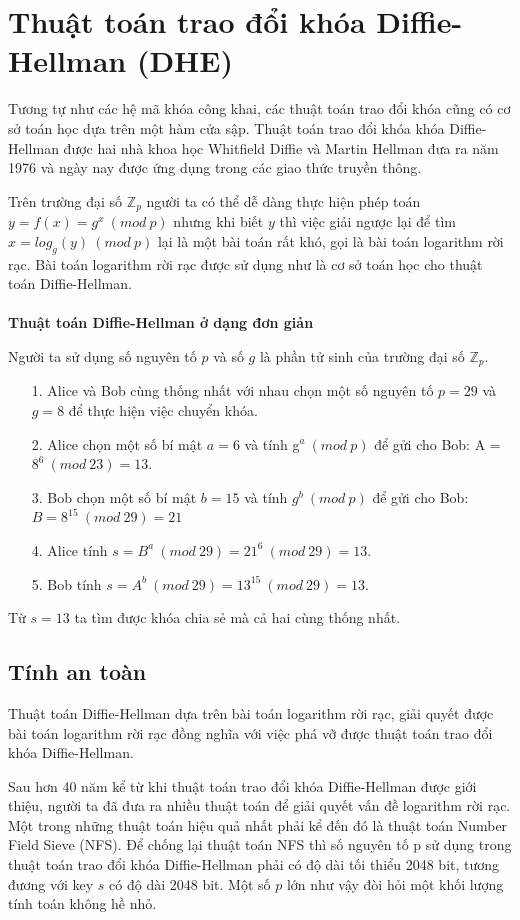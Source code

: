 \documentclass[a4paper,12pt]{report}
\begin{document}
\section{Thuật toán trao đổi khóa Diffie-Hellman (DHE)}
Tương tự như các hệ mã khóa công khai, các thuật toán trao đổi khóa cũng có cơ sở toán học dựa trên một hàm cửa sập. Thuật toán trao đổi khóa khóa Diffie-Hellman   được hai nhà khoa học Whitfield Diffie và Martin Hellman đưa ra năm 1976 và ngày nay được ứng dụng trong các giao thức truyền thông.

Trên trường đại số  $\mathbb{Z}_p$ người ta có thể dễ dàng thực hiện phép toán $y = f(x) = g^x \ (mod \ p)$ nhưng khi biết $y$ thì việc giải ngược lại để tìm $x = log_g(y) \ (mod \ p)$ lại là một bài toán rất khó, gọi là bài toán logarithm rời rạc. Bài toán logarithm rời rạc được sử dụng như là cơ sở toán học cho thuật toán Diffie-Hellman. \\ \\
\textbf{Thuật toán Diffie-Hellman ở dạng đơn giản}

Người ta sử dụng số nguyên tố $p$ và số $g$ là phần tử sinh của trường đại số $\mathbb{Z}_p$.
\begin{itemize}
\item[1. ] Alice và Bob cùng thống nhất với nhau chọn một số nguyên tố $p = 29$ và $g = 8$ để thực hiện việc chuyển khóa.
\item[2. ] Alice chọn một số bí mật $a = 6$ và tính g$^a \ (mod \ p)$ để gửi cho Bob: A = $8^6 \ (mod \ 23) = 13$.
\item[3. ] Bob chọn một số bí mật $b = 15$ và tính $g^b \ (mod \ p)$ để gửi cho Bob: $B = 8^{15} \ (mod \ 29) = 21$
\item[4. ] Alice tính $s = B^a \ (mod \ 29) = 21^6 \ (mod \ 29) = 13$.
\item[5. ] Bob tính $s = A^b \ (mod \ 29) = 13^{15} \ (mod \ 29) = 13$.
\end{itemize}
Từ $s = 13$ ta tìm được khóa chia sẻ mà cả hai cùng thống nhất.
\subsection*{Tính an toàn}
Thuật toán Diffie-Hellman dựa trên bài toán logarithm rời rạc, giải quyết được bài toán logarithm rời rạc đồng nghĩa với việc phá vỡ được thuật toán trao đổi khóa Diffie-Hellman.

Sau hơn 40 năm kể từ khi thuật toán trao đổi khóa Diffie-Hellman được giới thiệu, người ta đã đưa ra nhiều thuật toán để giải quyết vấn đề logarithm rời rạc. Một trong những thuật toán hiệu quả nhất phải kể đến đó là thuật toán Number Field Sieve (NFS). Để chống lại thuật toán NFS thì số nguyên tố p sử dụng trong thuật toán trao đổi khóa Diffie-Hellman phải có độ dài tối thiểu 2048 bit, tương đương với key $s$ có độ dài 2048 bit. Một số $p$ lớn như vậy đòi hỏi một khối lượng tính toán không hề nhỏ.
\end{document}
